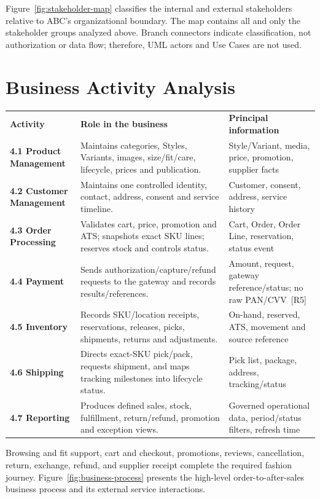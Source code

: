 \documentclass[10pt,a4paper]{article}
\begin{document}
Figure~\ref{fig:stakeholder-map} classifies the internal and external stakeholders relative to ABC's organizational boundary. The map contains all and only the stakeholder groups analyzed above. Branch connectors indicate classification, not authorization or data flow; therefore, UML actors and Use Cases are not used.
\newpage

\section{Business Activity Analysis}
\begin{tabularx}{\textwidth}{L{29mm}Y L{43mm}}
\textbf{Activity} & \textbf{Role in the business} & \textbf{Principal information}\\
\textbf{4.1 Product Management} & Maintains categories, Styles, Variants, images, size/fit/care, lifecycle, prices and publication. & Style/Variant, media, price, promotion, supplier facts\\
\textbf{4.2 Customer Management} & Maintains one controlled identity, contact, address, consent and service timeline. & Customer, consent, address, service history\\
\textbf{4.3 Order Processing} & Validates cart, price, promotion and ATS; snapshots exact SKU lines; reserves stock and controls status. & Cart, Order, Order Line, reservation, status event\\
\textbf{4.4 Payment} & Sends authorization/capture/refund requests to the gateway and records results/references. & Amount, request, gateway reference/status; no raw PAN/CVV~[R5]\\
\textbf{4.5 Inventory} & Records SKU/location receipts, reservations, releases, picks, shipments, returns and adjustments. & On-hand, reserved, ATS, movement and source reference\\
\textbf{4.6 Shipping} & Directs exact-SKU pick/pack, requests shipment, and maps tracking milestones into lifecycle status. & Pick list, package, address, tracking/status\\
\textbf{4.7 Reporting} & Produces defined sales, stock, fulfillment, return/refund, promotion and exception views. & Governed operational data, period/status filters, refresh time\\
\end{tabularx}

Browsing and fit support, cart and checkout, promotions, reviews, cancellation, return, exchange, refund, and supplier receipt complete the required fashion journey. Figure~\ref{fig:business-process} presents the high-level order-to-after-sales business process and its external service interactions.
\end{document}
